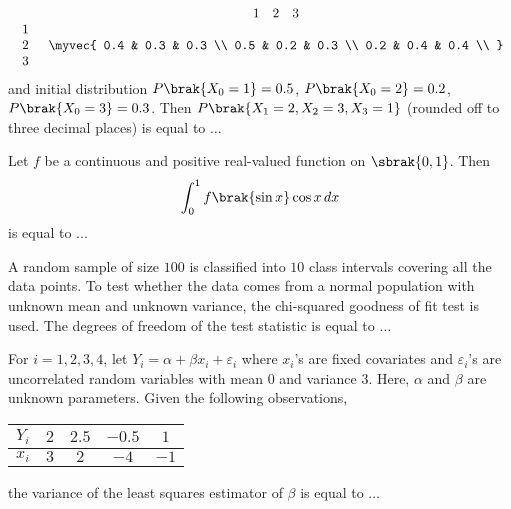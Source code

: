    \begin{align}
\begin{array}{c c}
    & \begin{array}{ccc}
        1 & 2 & 3 \\
    \end{array} \\ 
    \begin{array}{c}
        1 \\ 
        2 \\ 
        3 \\ 
    \end{array} & 
    \myvec{
        0.4 & 0.3 & 0.3 \\ 
        0.5 & 0.2 & 0.3 \\ 
        0.2 & 0.4 & 0.4 \\ 
    }
\end{array}
\end{align}
and initial distribution $P\brak{X_0 = 1} = 0.5$, $P\brak{X_0 = 2} = 0.2$, $P\brak{X_0 = 3} = 0.3$. Then $P\brak{X_1 = 2, X_2 = 3, X_3 = 1}$ (rounded off to three decimal places) is equal to $\dots$
\item Let $f$ be a continuous and positive real-valued function on $\sbrak{0, 1}$. Then
\begin{align}
\int^1_0 f\brak{\sin x} \cos x \, dx
\end{align}
is equal to ...
\item A random sample of size $100$ is classified into $10$ class intervals covering all the data points. To test whether the data comes from a normal population with unknown mean and unknown variance, the chi-squared goodness of fit test is used. The degrees of freedom of the test statistic is equal to $\dots$
\item For $i = 1, 2, 3, 4$, let $Y_i = \alpha + \beta x_i + \varepsilon_i$ where $x_i$'s are fixed covariates and $\varepsilon_i$'s are uncorrelated random variables with mean 0 and variance 3. Here, $\alpha$ and $\beta$ are unknown parameters. Given the following observations,
\begin{table}[h!]    
  \centering
\begin{tabular}{|c|c|c|c|c|}
\hline
$Y_i$ & $2$ & $2.5$ & $-0.5$ & $1$ \\\hline
$x_i$ & $3$ & $2$ & $-4$ & $-1$ \\
\hline
\end{tabular}
  
\end{table}
the variance of the least squares estimator of $\beta$ is equal to $\dots$
